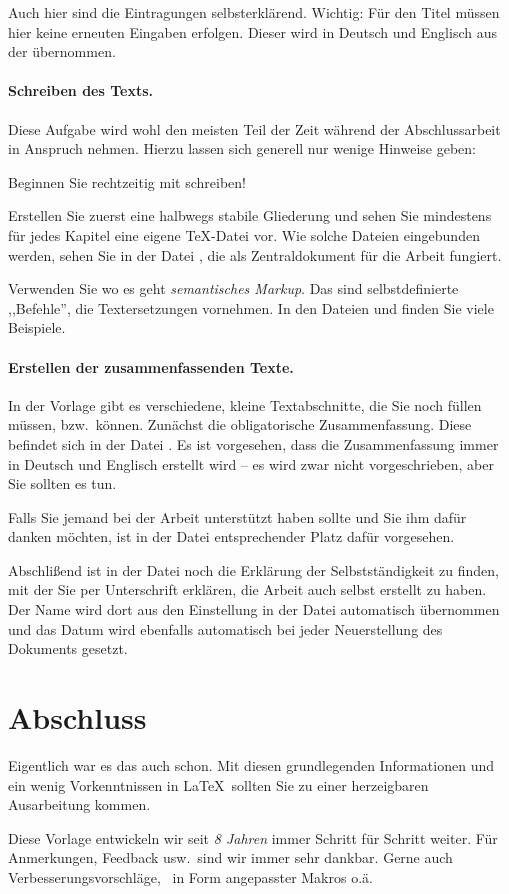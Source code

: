 Auch hier sind die Eintragungen selbsterkl\"arend. Wichtig: F\"ur den Titel m\"ussen hier keine erneuten Eingaben erfolgen. Dieser wird in Deutsch und Englisch aus der  \"ubernommen.

\paragraph{Schreiben des Texts.}
Diese Aufgabe wird wohl den meisten Teil der Zeit w\"ahrend der Abschlussarbeit in Anspruch nehmen. Hierzu lassen sich generell nur wenige Hinweise geben:
\begin{compactitem}
	\item Beginnen Sie rechtzeitig mit schreiben!
	\item Erstellen Sie zuerst eine halbwegs stabile Gliederung und sehen Sie mindestens f\"ur jedes Kapitel eine eigene \TeX-Datei vor. Wie solche Dateien eingebunden werden, sehen Sie in der Datei , die als Zentraldokument f\"ur die Arbeit fungiert.
	\item Verwenden Sie wo es geht \emph{semantisches Markup}. Das sind selbstdefinierte ,,Befehle'', die Textersetzungen vornehmen. In den Dateien  und  finden Sie viele Beispiele.
\end{compactitem}

\paragraph{Erstellen der zusammenfassenden Texte.}
In der Vorlage gibt es verschiedene, kleine Textabschnitte, die Sie noch f\"ullen m\"ussen, bzw.\ k\"onnen. Zun\"achst die obligatorische Zusammenfassung. Diese befindet sich in der Datei . Es ist vorgesehen, dass die Zusammenfassung immer in Deutsch und Englisch erstellt wird -- es wird zwar nicht vorgeschrieben, aber Sie sollten es tun.

Falls Sie jemand bei der Arbeit unterst\"utzt haben sollte und Sie ihm daf\"ur danken m\"ochten, ist in der Datei  entsprechender Platz daf\"ur vorgesehen.

Abschli{\ss}end ist in der Datei  noch die Erkl\"arung der Selbstst\"andigkeit zu finden, mit der Sie per Unterschrift erkl\"aren, die Arbeit auch selbst erstellt zu haben. Der Name wird dort aus den Einstellung in der Datei  automatisch \"ubernommen und das Datum wird ebenfalls automatisch bei jeder Neuerstellung des Dokuments gesetzt.

\section{Abschluss}
\label{sec:2:Abschluss}
Eigentlich war es das auch schon. Mit diesen grundlegenden Informationen und ein wenig Vorkenntnissen in \LaTeX\ sollten Sie zu einer herzeigbaren Ausarbeitung kommen.

Diese Vorlage entwickeln wir seit \emph{8 Jahren} immer Schritt f\"ur Schritt weiter. F\"ur Anmerkungen, Feedback usw.\ sind wir immer sehr dankbar. Gerne auch Verbesserungsvorschl\"age, \zB\ in Form angepasster Makros o.\"a.

